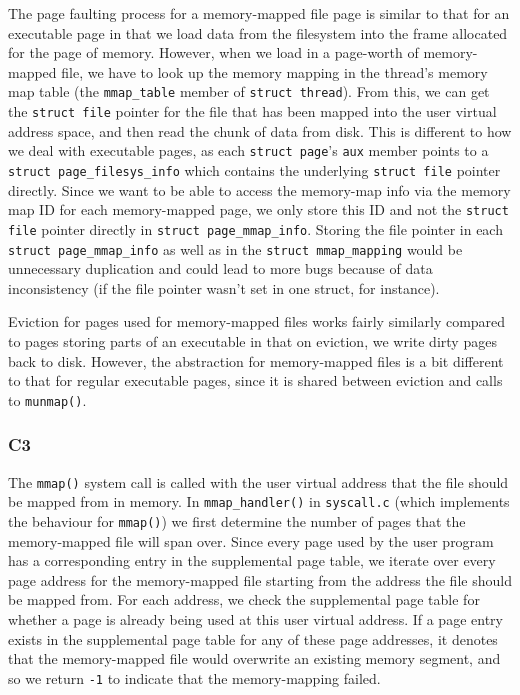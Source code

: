 \documentclass[a4wide, 11pt]{article}
\newcommand{\tx}{\texttt}
\begin{document}
The page faulting process for a memory-mapped file page is similar to that for an executable page in that we load data from the filesystem into the frame allocated for the page of memory. However, when we load in a page-worth of memory-mapped file, we have to look up the memory mapping in the thread's memory map table (the \tx{mmap\_table} member of \tx{struct thread}). From this, we can get the \tx{struct file} pointer for the file that has been mapped into the user virtual address space, and then read the chunk of data from disk. This is different to how we deal with executable pages, as each \tx{struct page}'s \tx{aux} member points to a \tx{struct page\_filesys\_info} which contains the underlying \tx{struct file} pointer directly. Since we want to be able to access the memory-map info via the memory map ID for each memory-mapped page, we only store this ID and not the \tx{struct file} pointer directly in \tx{struct page\_mmap\_info}. Storing the file pointer in each \tx{struct page\_mmap\_info} as well as in the \tx{struct mmap\_mapping} would be unnecessary duplication and could lead to more bugs because of data inconsistency (if the file pointer wasn't set in one struct, for instance).

Eviction for pages used for memory-mapped files works fairly similarly compared to pages storing parts of an executable in that on eviction, we write dirty pages back to disk. However, the abstraction for memory-mapped files is a bit different to that for regular executable pages, since it is shared between eviction and calls to \tx{munmap()}.

\subsubsection{C3}

The \tx{mmap()} system call is called with the user virtual address that the file should be mapped from in memory. In \tx{mmap\_handler()} in \tx{syscall.c} (which implements the behaviour for \tx{mmap()}) we first determine the number of pages that the memory-mapped file will span over. Since every page used by the user program has a corresponding entry in the supplemental page table, we iterate over every page address for the memory-mapped file starting from the address the file should be mapped from. For each address, we check the supplemental page table for whether a page is already being used at this user virtual address. If a page entry exists in the supplemental page table for any of these page addresses, it denotes that the memory-mapped file would overwrite an existing memory segment, and so we return \tx{-1} to indicate that the memory-mapping failed.
\end{document}
